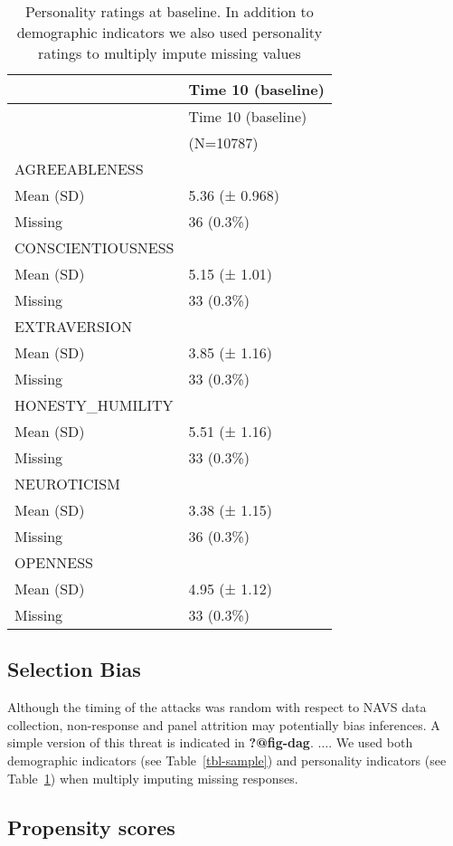 \documentclass[
  singlecolumn]{report}
\begin{document}
\hypertarget{tbl-personality}{}
\begin{longtable}[]{@{}ll@{}}
\caption{\label{tbl-personality}Personality ratings at baseline. In
addition to demographic indicators we also used personality ratings to
multiply impute missing values}\tabularnewline
\toprule\noalign{}
& Time 10 (baseline) \\
\midrule\noalign{}
\endfirsthead
\toprule\noalign{}
& Time 10 (baseline) \\
\midrule\noalign{}
\endhead
\bottomrule\noalign{}
\endlastfoot
& (N=10787) \\
AGREEABLENESS & \\
Mean (SD) & 5.36 (± 0.968) \\
Missing & 36 (0.3\%) \\
CONSCIENTIOUSNESS & \\
Mean (SD) & 5.15 (± 1.01) \\
Missing & 33 (0.3\%) \\
EXTRAVERSION & \\
Mean (SD) & 3.85 (± 1.16) \\
Missing & 33 (0.3\%) \\
HONESTY\_HUMILITY & \\
Mean (SD) & 5.51 (± 1.16) \\
Missing & 33 (0.3\%) \\
NEUROTICISM & \\
Mean (SD) & 3.38 (± 1.15) \\
Missing & 36 (0.3\%) \\
OPENNESS & \\
Mean (SD) & 4.95 (± 1.12) \\
Missing & 33 (0.3\%) \\
\end{longtable}

\hypertarget{selection-bias}{%
\subsection{Selection Bias}\label{selection-bias}}

Although the timing of the attacks was random with respect to NAVS data
collection, non-response and panel attrition may potentially bias
inferences. A simple version of this threat is indicated in
\textbf{?@fig-dag}. \(\dots\). We used both demographic indicators (see
Table~\ref{tbl-sample}) and personality indicators (see
Table~\ref{tbl-personality}) when multiply imputing missing responses.

\hypertarget{propensity-scores}{%
\subsection{Propensity scores}\label{propensity-scores}}
\end{document}
